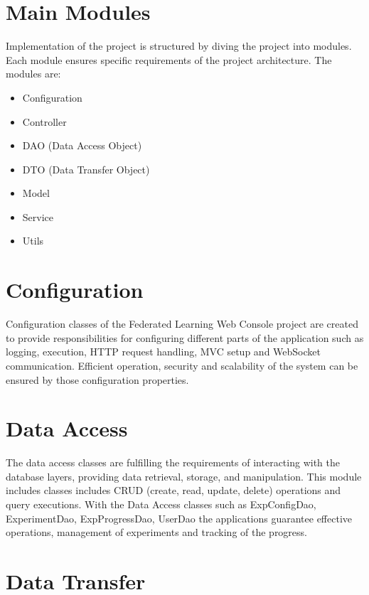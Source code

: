 \section{Main Modules}

Implementation of the project is structured by diving the project into modules. Each module ensures specific requirements of the project architecture. The modules are:\\
\begin{itemize}
    \item Configuration
    \item Controller
    \item DAO (Data Access Object)
    \item DTO (Data Transfer Object)
    \item Model
    \item Service
    \item Utils
\end{itemize}

\section{Configuration}

Configuration classes of the Federated Learning Web Console project are created to provide responsibilities for configuring different parts of the application such as
logging, execution, HTTP request handling, MVC setup and WebSocket communication. Efficient operation, security and scalability of the system can be ensured by those configuration properties.

\section{Data Access}

The data access classes are fulfilling the requirements of interacting with the database layers, providing data retrieval, storage, and manipulation. This module includes classes includes CRUD
(create, read, update, delete) operations and query executions. With the Data Access classes such as ExpConfigDao, ExperimentDao, ExpProgressDao, UserDao the applications guarantee effective operations,
management of experiments and tracking of the progress.


\section{Data Transfer}

